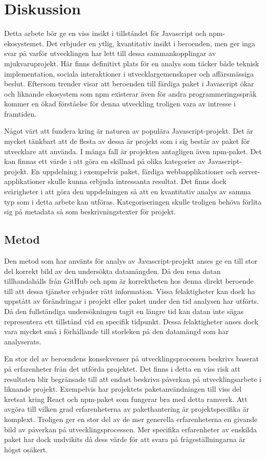 \section{Diskussion}
\label{sec:joel_o-discussion}
Detta arbete bör ge en viss insikt i tillståndet för Javascript och npm-ekosystemet. Det erbjuder en ytlig, kvantitativ insikt i beroenden, men ger inga svar på varför utvecklingen har lett till dessa sammankopplingar av mjukvaruprojekt. Här finns definitivt plats för en analys som täcker både teknisk implementation, sociala interaktioner i utvecklargemenskaper och affärsmässiga beslut. Eftersom trender visar att beroenden till färdiga paket i Javascript ökar\cite{Wittern:2016} och liknande ekosystem som npm existerar även för andra programmeringsspråk kommer en ökad förståelse för denna utveckling troligen vara av intresse i framtiden.

Något värt att fundera kring är naturen av populära Javascript-projekt. Det är mycket tänkbart att de flesta av dessa är projekt som i sig består av paket för utvecklare att använda. I många fall är projekten antagligen även npm-paket. Det kan finnas ett värde i att göra en skillnad på olika kategorier av Javascript-projekt. En uppdelning i exempelvis paket, färdiga webbapplikationer och server-applikationer skulle kunna erbjuda intressanta resultat. Det finns dock svårigheter i att göra den uppdelningen så att en kvantitativ analys av samma typ som i detta arbete kan utföras. Kategoriseringen skulle troligen behöva förlita sig på metadata så som beskrivningstexter för projekt.

\subsection{Metod}
\label{subsec:joel_o-discussion-method}
Den metod som har använts för analys av Javascript-projekt anses ge en till stor del korrekt bild av den undersökta datamängden. Då den rena datan tillhandahålls från GitHub och npm är korrektheten hos denna direkt beroende till att dessa tjänster erbjuder rätt information. Vissa felaktigheter kan dock ha uppstått av förändringar i projekt eller paket under den tid analysen har utförts. Då den fullständiga undersökningen tagit en längre tid kan datan inte sägas representera ett tillstånd vid en specifik tidpunkt. Dessa felaktigheter anses dock vara mycket små i förhållande till storleken på den datamängd som har analyserats.

En stor del av beroendens konsekvenser på utvecklingsprocessen beskrivs baserat på erfarenheter från det utförda projektet. Det finns i detta en viss risk att resultaten blir begränsade till att endast beskriva påverkan på utvecklingsarbete i liknande projekt. Exempelvis har projektets paketanvändningen till viss del kretsat kring React och npm-paket som fungerar bra med detta ramverk. Att avgöra till vilken grad erfarenheterna av pakethantering är projektspecifika är komplext. Troligen ger en stor del av de mer generella erfarenheterna en givande bild av påverkan på utvecklingsprocessen. Mer specifika erfarenheter av enskilda paket har dock undvikits då dess värde för att svara på frågeställningarna är högst osäkert.

